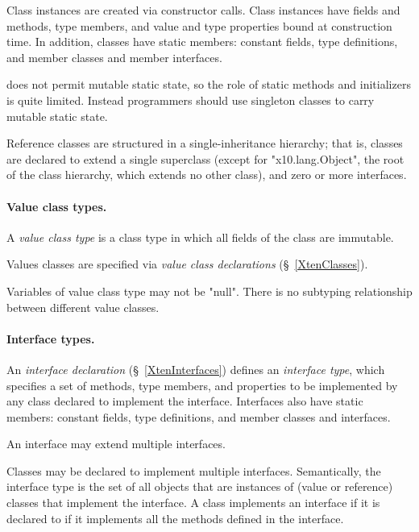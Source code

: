         Class instances are created via
        constructor calls.  Class instances have fields and
        methods, type members, and value and type properties bound at
        construction time.  In addition, classes have static
        members: constant fields, type definitions, and member
        classes and member interfaces.

\Xten{} does
not
permit mutable static state, so the role of static methods and
initializers is quite limited. Instead programmers should use
singleton classes to carry mutable static state.
        
        Reference classes are structured in a
        single-inheritance hierarchy; that is,
        classes are declared to extend a single
        superclass (except for \xcd"x10.lang.Object", the root
        of the class hierarchy, which extends no other class),
        and zero or more interfaces.

\paragraph{Value class types.}

A {\em value class type}
is a class type in which all fields of the class are immutable.

Values classes are specified via {\em value class declarations}
(\S~\ref{XtenClasses}).

Variables of value class type may not be \xcd"null".
There is no subtyping relationship between different value
classes.

\paragraph{Interface types.}
        An {\em interface declaration} (\S~\ref{XtenInterfaces})
        defines an {\em interface type}, which specifies a set of
        methods, type members, and properties to be implemented by any class
        declared to implement the interface.  Interfaces also
        have static members: constant fields, type definitions,
        and member classes and interfaces.


        An interface may extend multiple interfaces.

Classes may be declared to implement 
multiple interfaces. 
Semantically, the interface type is the set of all objects that are
instances of (value or reference) classes that implement the
interface. A class implements an interface if it is declared to if
it implements all the methods defined in the interface.
        
